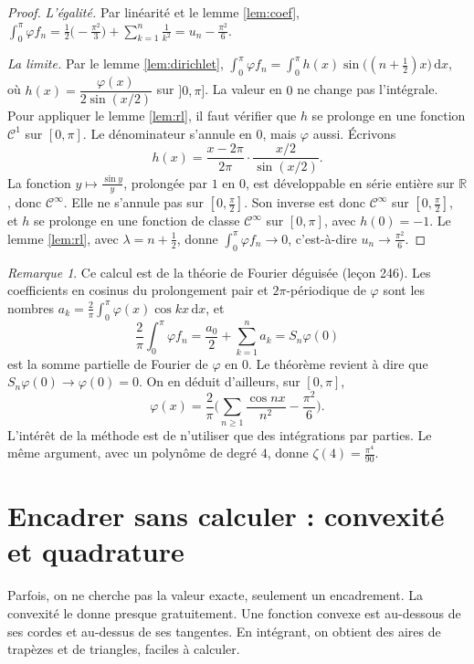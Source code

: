 \documentclass[11pt,a4paper]{article}
\theoremstyle{plain}
\theoremstyle{definition}
\theoremstyle{remark}
\newtheorem{remarque}[theoreme]{Remarque}
\newcommand{\R}{\mathbb{R}}
\newcommand{\dd}{\,\mathrm{d}}
\begin{document}
\begin{proof}
\emph{L'égalité.} Par linéarité et le lemme \ref{lem:coef}, $\int_0^\pi\varphi f_n=\frac12\big(-\frac{\pi^2}3\big)+\sum_{k=1}^n\frac1{k^2}=u_n-\frac{\pi^2}6$.

\emph{La limite.} Par le lemme \ref{lem:dirichlet}, $\int_0^\pi\varphi f_n=\int_0^\pi h(x)\sin\big((n+\frac12)x\big)\dd x$, où $h(x)=\dfrac{\varphi(x)}{2\sin(x/2)}$ sur $]0,\pi]$. La valeur en $0$ ne change pas l'intégrale. Pour appliquer le lemme \ref{lem:rl}, il faut vérifier que $h$ se prolonge en une fonction $\mathcal C^1$ sur $[0,\pi]$. Le dénominateur s'annule en $0$, mais $\varphi$ aussi. Écrivons
\[
  h(x)=\frac{x-2\pi}{2\pi}\cdot\frac{x/2}{\sin(x/2)} .
\]
La fonction $y\mapsto\frac{\sin y}{y}$, prolongée par $1$ en $0$, est développable en série entière sur $\R$, donc $\mathcal C^\infty$. Elle ne s'annule pas sur $[0,\frac\pi2]$. Son inverse est donc $\mathcal C^\infty$ sur $[0,\frac\pi2]$, et $h$ se prolonge en une fonction de classe $\mathcal C^\infty$ sur $[0,\pi]$, avec $h(0)=-1$. Le lemme \ref{lem:rl}, avec $\lambda=n+\frac12$, donne $\int_0^\pi\varphi f_n\to0$, c'est-à-dire $u_n\to\frac{\pi^2}6$.
\end{proof}

\begin{remarque}
Ce calcul est de la théorie de Fourier déguisée (leçon 246). Les coefficients en cosinus du prolongement pair et $2\pi$-périodique de $\varphi$ sont les nombres $a_k=\frac2\pi\int_0^\pi\varphi(x)\cos kx\dd x$, et
\[
  \frac2\pi\int_0^\pi\varphi f_n=\frac{a_0}2+\sum_{k=1}^na_k=S_n\varphi(0)
\]
est la somme partielle de Fourier de $\varphi$ en $0$. Le théorème revient à dire que $S_n\varphi(0)\to\varphi(0)=0$. On en déduit d'ailleurs, sur $[0,\pi]$,
\[
  \varphi(x)=\frac2\pi\Big(\sum_{n\geq1}\frac{\cos nx}{n^2}-\frac{\pi^2}6\Big).
\] L'intérêt de la méthode est de n'utiliser que des intégrations par parties. Le même argument, avec un polynôme de degré $4$, donne $\zeta(4)=\frac{\pi^4}{90}$.
\end{remarque}

\section{Encadrer sans calculer : convexité et quadrature}

Parfois, on ne cherche pas la valeur exacte, seulement un encadrement. La convexité le donne presque gratuitement. Une fonction convexe est au-dessous de ses cordes et au-dessus de ses tangentes. En intégrant, on obtient des aires de trapèzes et de triangles, faciles à calculer.
\end{document}
